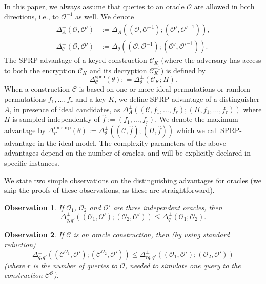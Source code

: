 \documentclass{llncs}
\newtheorem{obs}{Observation}
\begin{document}
In this paper, we always assume that queries to an oracle $\mathcal{O}$ are allowed in both directions, i.e., to $\mathcal{O}^{-1}$ as well. We denote
\begin{align*}
\Delta^{\pm}_A(\mathcal{O},\mathcal{O'})&:=\Delta_A\left((\mathcal{O},\mathcal{O}^{-1});(\mathcal{O'},\mathcal{O'}^{-1})\right),\\
\Delta^{\pm}_{\theta}(\mathcal{O},\mathcal{O'})&:=\Delta_{\theta}\left((\mathcal{O},\mathcal{O}^{-1});(\mathcal{O'},\mathcal{O'}^{-1})\right).
\end{align*}
The SPRP-advantage of a keyed construction $\mathcal{C}_K$ (where the adversary has access to both the encryption $\mathcal{C}_K$ and its decryption $\mathcal{C}_K^{-1}$) is defined by $$\Delta_{\mathcal{C}}^{\mathrm{sprp}}(\theta): = \Delta^{\pm}_{\theta}(\mathcal{C}_K; \Pi).$$
When a construction $\mathcal{C}$ is based on one or more ideal permutations or random permutations $f_1, \ldots, f_r$ and a key $K$, we define SPRP-advantage of a distinguisher $A$, in presence of ideal candidates,
as $\Delta^{\pm}_{A}((\mathcal{C}, f_1,\ldots, f_r); (\Pi, f_1, \ldots, f_r))$ where $\Pi$ is sampled independently of $\hat{f} := (f_1, \ldots, f_r)$. We denote the maximum advantage by $\Delta_{\mathcal{C}}^{\mathrm{im\textit{-}sprp}}(\theta) := \Delta^{\pm}_{\theta}((\mathcal{C}, \hat{f}); (\Pi, \hat{f}))$ which we call SPRP-advantage in the ideal model.
The complexity parameters of the above advantages depend on the number of oracles, and will be explicitly declared in specific instances.

We state two simple observations on the distinguishing advantages for oracles (we skip the proofs of these observations, as these are straightforward).
\begin{obs}\label{obs1}
If $\mathcal{O}_1$, $\mathcal{O}_2$ and $\mathcal{O}'$ are three independent oracles, then
$$\Delta^{\pm}_{q,q'}\left((\mathcal{O}_1, \mathcal{O}');(\mathcal{O}_2, \mathcal{O}')\right) \leq \Delta^{\pm}_{q}(\mathcal{O}_1;\mathcal{O}_2).$$
\end{obs}
\begin{obs}\label{obs2}
If $\mathcal{C}$ is an oracle construction, then (by using standard reduction)
$$\Delta^{\pm}_{q,q'}\left((\mathcal{C}^{\mathcal{O}_1}, \mathcal{O}');(\mathcal{C}^{\mathcal{O}_2}, \mathcal{O}')\right) \leq \Delta^{\pm}_{rq,q'}\left((\mathcal{O}_1, \mathcal{O}');(\mathcal{O}_2, \mathcal{O}')\right)$$
(where $r$ is the number of queries to $\mathcal{O}$, needed to simulate one query to the construction $\mathcal{C}^{\mathcal{O}}$).
\end{obs}
\end{document}

